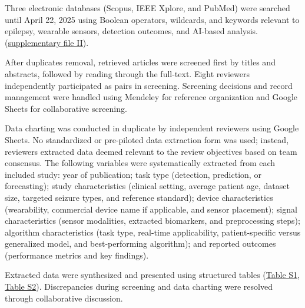 Three electronic databases (Scopus, IEEE Xplore, and PubMed) were searched until April 22, 2025  using Boolean operators, wildcards, and keywords relevant to epilepsy, wearable sensors, detection outcomes, and AI-based analysis. (\href{https://docs.google.com/document/d/1FJTEZIhRoBhq3tmehHFUZllaM-GqR_4c1j9waukcQow/edit?tab=t.0}{supplementary file II}). 

After duplicates removal, retrieved articles were screened first by titles and abstracts, followed by reading through the full-text. Eight reviewers independently participated as pairs in screening. Screening decisions and record management were handled using Mendeley for reference organization and Google Sheets for collaborative screening. 

Data charting was conducted in duplicate by independent reviewers using Google Sheets. No standardized or pre-piloted data extraction form was used; instead, reviewers extracted data deemed relevant to the review objectives based on team consensus. The following variables were systematically extracted from each included study: year of publication; task type (detection, prediction, or forecasting); study characteristics (clinical setting,  average patient age, dataset size, targeted seizure types, and reference standard); device characteristics (wearability, commercial device name if applicable, and sensor placement); signal characteristics (sensor modalities, extracted biomarkers, and preprocessing steps); algorithm characteristics (task type, real-time applicability, patient-specific versus generalized model, and best-performing algorithm); and reported outcomes (performance metrics and key findings). 

Extracted data were synthesized and presented using structured tables (\href{https://docs.google.com/spreadsheets/d/1FjxwkHFbNDM84nuqg513gR_0vIVql-evoT1EMiqSYZU/edit?pli=1&gid=1255223968#gid=1255223968}{Table S1}, \href{https://docs.google.com/spreadsheets/d/1FjxwkHFbNDM84nuqg513gR_0vIVql-evoT1EMiqSYZU/edit?pli=1&gid=97270185#gid=97270185}{Table S2}).
Discrepancies during screening and data charting were resolved through collaborative discussion.
